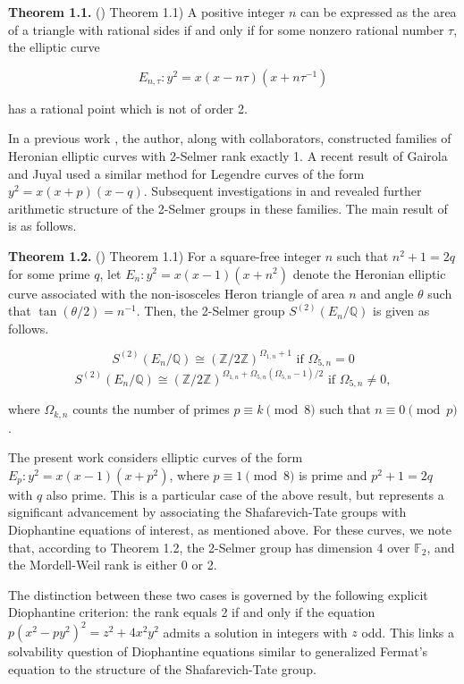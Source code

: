 \documentclass[10pt]{article}
\begin{document}
\noindent \textbf{Theorem 1.1.} (\cite{14}) Theorem 1.1) A positive integer \(n\) can be expressed as the area of a triangle with rational sides if and only if for some nonzero rational number \(\tau\), the elliptic curve

\[E_{n,\tau}: y^{2} = x(x - n\tau)(x + n\tau^{-1})\]

has a rational point which is not of order 2.

In a previous work \cite{7}, the author, along with collaborators, constructed families of Heronian elliptic curves with 2-Selmer rank exactly 1. A recent result of Gairola and Juyal \cite{13} used a similar method for Legendre curves of the form \(y^{2} = x(x + p)(x - q)\). Subsequent investigations in \cite{8} and \cite{9} revealed further arithmetic structure of the 2-Selmer groups in these families. The main result of \cite{9} is as follows.

\noindent \textbf{Theorem 1.2.} (\cite{9}) Theorem 1.1) For a square-free integer \(n\) such that \(n^2 + 1 = 2q\) for some prime \(q\), let \(E_{n}: y^{2} = x(x - 1)(x + n^{2})\) denote the Heronian elliptic curve associated with the non-isosceles Heron triangle of area \(n\) and angle \(\theta\) such that \(\tan(\theta/2) = n^{-1}\). Then, the 2-Selmer group \(S^{(2)}(E_{n}/\mathbb{Q})\) is given as follows.

\[S^{(2)}(E_n / \mathbb{Q}) \cong (\mathbb{Z}/2\mathbb{Z})^{\Omega_{1,n} + 1} \text{ if } \Omega_{5,n} = 0\] \[S^{(2)}(E_n / \mathbb{Q}) \cong (\mathbb{Z}/2\mathbb{Z})^{\Omega_{1,n} + \Omega_{5,n}(\Omega_{5,n} - 1)/2} \text{ if } \Omega_{5,n} \neq 0,\]

where \(\Omega_{k,n}\) counts the number of primes \(p \equiv k \pmod{8}\) such that \(n \equiv 0 \pmod{p}\).

The present work considers elliptic curves of the form \(E_{p}: y^{2} = x(x - 1)(x + p^{2})\), where \(p \equiv 1 \pmod{8}\) is prime and \(p^{2} + 1 = 2q\) with \(q\) also prime. This is a particular case of the above result, but represents a significant advancement by associating the Shafarevich-Tate groups with Diophantine equations of interest, as mentioned above. For these curves, we note that, according to Theorem 1.2, the 2-Selmer group has dimension 4 over \(\mathbb{F}_{2}\), and the Mordell-Weil rank is either 0 or 2.

The distinction between these two cases is governed by the following explicit Diophantine criterion: the rank equals 2 if and only if the equation \(p(x^{2} - py^{2})^{2} = z^{2} + 4x^{2}y^{2}\) admits a solution in integers with \(z\) odd. This links a solvability question of Diophantine equations similar to generalized Fermat's equation to the structure of the Shafarevich-Tate group.
\end{document}
